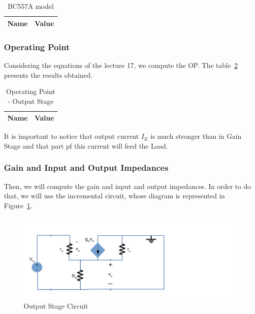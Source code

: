 \begin{table}[H]
  \centering
  \begin{tabular}{|l|r|}
     \hline    
    {\bf Name} & {\bf Value} \\ \hline   
    
  \end{tabular}
  \caption{BC557A model}
  \label{tab:modelos}
\end{table}

\subsubsection{Operating Point}
Considering the equations of the lecture 17, we compute the OP. The table~\ref{tab:osop} presents the results obtained.

\begin{table}[H]
  \centering
  \begin{tabular}{|l|r|}
     \hline    
    {\bf Name} & {\bf Value} \\ \hline   
    
  \end{tabular}
  \caption{Operating Point - Output Stage}
  \label{tab:osop}
\end{table}

It is important to notice that output current $I_E$ is much stronger than in Gain Stage and that part pf this current will feed the Load.

\subsubsection{Gain and Input and Output Impedances}
Then, we will compute the gain and input and output impedances. In order to do that, we will  use the incremental circuit, whose diagram is represented in Figure~\ref{fig:osincrem}.

\begin{figure}[H] \centering
\includegraphics[width=0.8\linewidth]{incrementalos.pdf}
\caption{Output Stage Circuit}                                     %
\label{fig:osincrem}
\end{figure}

